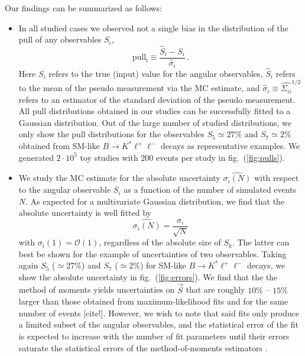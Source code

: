 \documentclass[aps,nofootinbib,preprintnumbers,prd,twocolumn]{revtex4-1}
\newcommand{\est}[1]{\widehat{#1}}
\newcommand{\order}[1]{\mathcal{O}\left({#1}\right)}
\newcommand{\reffig}[1]{fig.~(\ref{fig:#1})}
\newcommand{\danny}[1]{{\color{purple}#1}}
\begin{document}
Our findings can be summarized as follows:
\begin{itemize}
    \item In all studied cases we observed not a single bias in the distribution of the $\mathrm{pull}$
        of any observables $S_i$,
        \begin{equation}
            \mathrm{pull_i} \equiv \frac{\est{S}_i - S_i}{\est{\sigma}_{i}}\,.
        \end{equation}
        Here $S_i$ refers to the true (input) value for the angular observables, $\est{S}_i$ refers to the
        mean of the pseudo measurement via the MC estimate, and $\est{\sigma}_{i} \equiv \est{\Sigma_{ii}}^{1/2}$
        refers to an estimator of the standard deviation of the pseudo measurement. All pull distributions
        obtained in our studies can be successfully
        fitted to a Gaussian distribution. Out of the large number  of studied distributions, we only show the pull distributions for the observables
        $S_5 \simeq 27\%$ and $S_7 \simeq 2\%$ obtained from SM-like $B\to K^*\ell^+\ell^-$
        decays as representative examples. We generated $2\cdot 10^5$ toy studies
        with $200$ events per study in \reffig{pulls}.

    \item We study the MC estimate for the absolute uncertainty $\est{\sigma_i(N)}$ with respect to the angular observable $S_i$
        as a function of the number of simulated events $N$. As expected for a multivariate Gaussian
        distribution, we find that the absolute uncertainty is well fitted by
        \begin{equation}
            \label{eq:unc-on-mean}
            \est{\sigma_i(N)} = \frac{\sigma_i}{\sqrt{N}}
        \end{equation}
        with $\sigma_i(1) = \order{1}$, regardless of the absolute size of $S_k$. The latter can best be shown
        for the example of uncertainties of two observables. Taking again $S_5$ ($\simeq 27\%$) and $S_7$ ($\simeq 2\%$)
        for SM-like $B\to K^*\ell^+\ell^-$ decays, we show the absolute uncertainty in \reffig{errors}.
        We find that the the method of moments yields uncertainties on $\vec{S}$ that are roughly
        $10\%$ -- $15\%$ larger than those obtained from maximum-likelihood fits and for the same
        number of events \danny{[cite!]}. However, we wish to note that said fits only produce a limited
        subset of the angular observables, and the statistical error of the fit is expected to increase
        with the number of fit parameters until their errors saturate the statistical errors of the method-of-moments
        estimators \cite[sec. 8]{Cowan:1998ji}.


\end{itemize}
\end{document}
